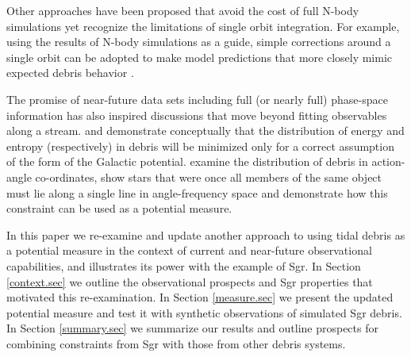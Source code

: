 \documentclass[preprint]{aastex}
\begin{document}
Other approaches have been proposed that avoid the cost of full N-body simulations yet recognize the limitations of single orbit integration.
For example, using the results of N-body simulations as a guide, simple corrections around a single orbit can be adopted to make model predictions that more closely
mimic expected debris behavior \citep[e.g.][]{johnston99b,varghese11}.

The promise of near-future data sets including full (or nearly full) phase-space information has also inspired discussions that move beyond fitting observables along a
stream.
\citet{binney08} and \citet{penarrubia12} demonstrate conceptually that the distribution of energy and entropy (respectively) in debris will be minimized only for a correct
assumption of the form of the Galactic potential.
\citet{sanders13b} examine the distribution of debris in action-angle co-ordinates, show stars that were once all members of the same object must lie along a single line in angle-frequency space and demonstrate how this constraint can be used as a potential measure. 

In this paper we re-examine and update  another approach to using tidal debris as a potential measure \citep[originially proposed by][]{johnston99a}  in the context of current and near-future observational capabilities, and illustrates its power with the example of Sgr.
In Section \ref{context.sec} we outline the observational prospects and Sgr properties that motivated this re-examination.
In Section \ref{measure.sec} we present the updated potential measure and test it with synthetic observations of simulated Sgr debris.
In Section \ref{summary.sec} we summarize our results and outline prospects for combining constraints from Sgr with those from other debris systems.

%
\end{document}
